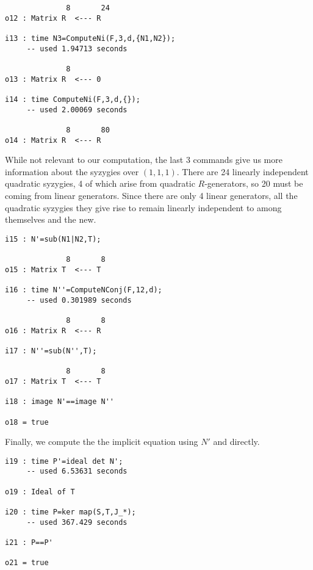 \documentclass[fleqn,reqno]{amsart}
\numberwithin{first}{chapter}
\begin{document}
\begin{example}[$\mt{ex601}$]
\begin{verbatim}
              8       24
o12 : Matrix R  <--- R

i13 : time N3=ComputeNi(F,3,d,{N1,N2});
     -- used 1.94713 seconds

              8
o13 : Matrix R  <--- 0

i14 : time ComputeNi(F,3,d,{});
     -- used 2.00069 seconds

              8       80
o14 : Matrix R  <--- R
\end{verbatim}

While not relevant to our computation, the last 3 commands give us more information
about the syzygies over $(1,1,1)$.
There are 24 linearly independent quadratic syzygies,
4 of which arise from quadratic $R$-generators, so 20 must be coming from linear generators.
Since there are only 4 linear generators, all the quadratic syzygies they give rise to
remain linearly independent to among themselves and the new.

\begin{verbatim}
i15 : N'=sub(N1|N2,T);

              8       8
o15 : Matrix T  <--- T

i16 : time N''=ComputeNConj(F,12,d);
     -- used 0.301989 seconds

              8       8
o16 : Matrix R  <--- R

i17 : N''=sub(N'',T);

              8       8
o17 : Matrix T  <--- T

i18 : image N'==image N''

o18 = true
\end{verbatim}

Finally, we compute the the implicit equation using $N'$ and directly.

\begin{verbatim}
i19 : time P'=ideal det N';
     -- used 6.53631 seconds

o19 : Ideal of T

i20 : time P=ker map(S,T,J_*);
     -- used 367.429 seconds

i21 : P==P'

o21 = true
\end{verbatim}
\end{example}
\end{document}
